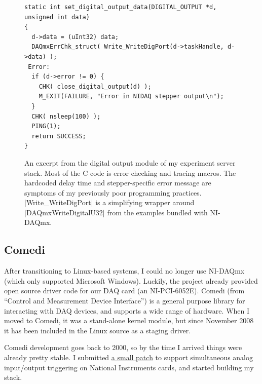 \begin{figure}
  \begin{center}
\begin{verbatim}
static int set_digital_output_data(DIGITAL_OUTPUT *d, unsigned int data)
{
  d->data = (uInt32) data;
  DAQmxErrChk_struct( Write_WriteDigPort(d->taskHandle, d->data) );
 Error:
  if (d->error != 0) {
    CHK( close_digital_output(d) );
    M_EXIT(FAILURE, "Error in NIDAQ stepper output\n");
  }
  CHK( nsleep(100) );
  PING(1);
  return SUCCESS;
}
\end{verbatim}
    \caption{An excerpt from the digital output module of my
      experiment server stack.  Most of the C code is error checking
      and tracing macros.  The hardcoded delay time and
      stepper-specific error message are symptoms of my previously
      poor programming practices.  |Write_WriteDigPort| is a
      simplifying wrapper around |DAQmxWriteDigitalU32| from
      the examples bundled with NI-DAQmx.\label{fig:ni-daqmx}}
  \end{center}
\end{figure}

\subsection{Comedi}
\label{sec:comedi}

After transitioning to Linux-based systems, I could no longer use
NI-DAQmx (which only supported Microsoft Windows).  Luckily, the
 project already provided open source driver code
for our DAQ card (an NI-PCI-6052E).  Comedi (from ``Control and
Measurement Device Interface'') is a general purpose library for
interacting with DAQ devices, and supports a wide range of hardware.
When I moved to Comedi, it was a stand-alone kernel module, but since
November 2008 it has been included in the Linux source as a staging
driver.

Comedi development goes back to 2000, so by the time I arrived things
were already pretty stable.  I submitted
\href{http://comedi.org/git?p=comedi/comedi.git;a=commit;h=4284c2266987ad08a26f2758cd09fef06d1ce3cf}{a
  small patch} to support simultaneous analog input/output triggering
on National Instruments cards, and started building my stack.
